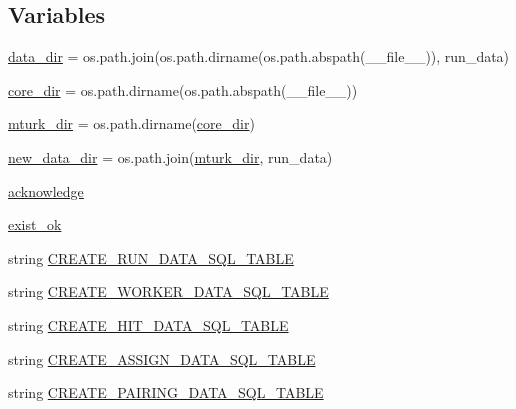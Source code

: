 \subsection*{Variables}
\begin{DoxyCompactItemize}
\item 
\hyperlink{namespaceparlai_1_1mturk_1_1core_1_1mturk__data__handler_a2f7d42b72f26357bf0939d23695604e8}{data\+\_\+dir} = os.\+path.\+join(os.\+path.\+dirname(os.\+path.\+abspath(\+\_\+\+\_\+file\+\_\+\+\_\+)), \textquotesingle{}run\+\_\+data\textquotesingle{})
\item 
\hyperlink{namespaceparlai_1_1mturk_1_1core_1_1mturk__data__handler_a8006ff4941c7804160312bc362820e97}{core\+\_\+dir} = os.\+path.\+dirname(os.\+path.\+abspath(\+\_\+\+\_\+file\+\_\+\+\_\+))
\item 
\hyperlink{namespaceparlai_1_1mturk_1_1core_1_1mturk__data__handler_ac73b24261e8fd0c7cf04c221db3bfd6f}{mturk\+\_\+dir} = os.\+path.\+dirname(\hyperlink{namespaceparlai_1_1mturk_1_1core_1_1mturk__data__handler_a8006ff4941c7804160312bc362820e97}{core\+\_\+dir})
\item 
\hyperlink{namespaceparlai_1_1mturk_1_1core_1_1mturk__data__handler_a49829a6a392d6975e37c5fb375688fdb}{new\+\_\+data\+\_\+dir} = os.\+path.\+join(\hyperlink{namespaceparlai_1_1mturk_1_1core_1_1mturk__data__handler_ac73b24261e8fd0c7cf04c221db3bfd6f}{mturk\+\_\+dir}, \textquotesingle{}run\+\_\+data\textquotesingle{})
\item 
\hyperlink{namespaceparlai_1_1mturk_1_1core_1_1mturk__data__handler_a2a3b9b1990945eb35021d48ba28f0dcb}{acknowledge}
\item 
\hyperlink{namespaceparlai_1_1mturk_1_1core_1_1mturk__data__handler_af54f914df9420867e3e860b40f25792d}{exist\+\_\+ok}
\item 
string \hyperlink{namespaceparlai_1_1mturk_1_1core_1_1mturk__data__handler_a7d90ca5a66368c8ee0303db002bf0df9}{C\+R\+E\+A\+T\+E\+\_\+\+R\+U\+N\+\_\+\+D\+A\+T\+A\+\_\+\+S\+Q\+L\+\_\+\+T\+A\+B\+LE}
\item 
string \hyperlink{namespaceparlai_1_1mturk_1_1core_1_1mturk__data__handler_a9cc89230a62225a6345d560bf37b5449}{C\+R\+E\+A\+T\+E\+\_\+\+W\+O\+R\+K\+E\+R\+\_\+\+D\+A\+T\+A\+\_\+\+S\+Q\+L\+\_\+\+T\+A\+B\+LE}
\item 
string \hyperlink{namespaceparlai_1_1mturk_1_1core_1_1mturk__data__handler_a5748b70bd8f4976fede604d8f69c3412}{C\+R\+E\+A\+T\+E\+\_\+\+H\+I\+T\+\_\+\+D\+A\+T\+A\+\_\+\+S\+Q\+L\+\_\+\+T\+A\+B\+LE}
\item 
string \hyperlink{namespaceparlai_1_1mturk_1_1core_1_1mturk__data__handler_a2456f086cab0b75ae3975b2f6be99bb1}{C\+R\+E\+A\+T\+E\+\_\+\+A\+S\+S\+I\+G\+N\+\_\+\+D\+A\+T\+A\+\_\+\+S\+Q\+L\+\_\+\+T\+A\+B\+LE}
\item 
string \hyperlink{namespaceparlai_1_1mturk_1_1core_1_1mturk__data__handler_a8a16e3b7640699a3abec2eec3d20dbd1}{C\+R\+E\+A\+T\+E\+\_\+\+P\+A\+I\+R\+I\+N\+G\+\_\+\+D\+A\+T\+A\+\_\+\+S\+Q\+L\+\_\+\+T\+A\+B\+LE}
\end{DoxyCompactItemize}


